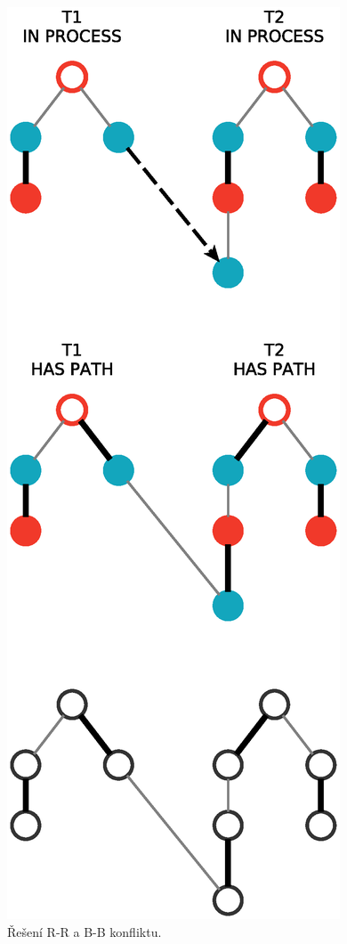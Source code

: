 \documentclass[a4paper, 11pt, titlepage, final]{article}[3. prosinec 2011]
\begin{document}
\begin{figure}[ht]
  \centering
  \includegraphics[scale=0.5]{img/haspath.eps}
  \caption{Řešení R-R a B-B konfliktu.}
  \label{imgHasPath}
\end{figure}
\end{document}
